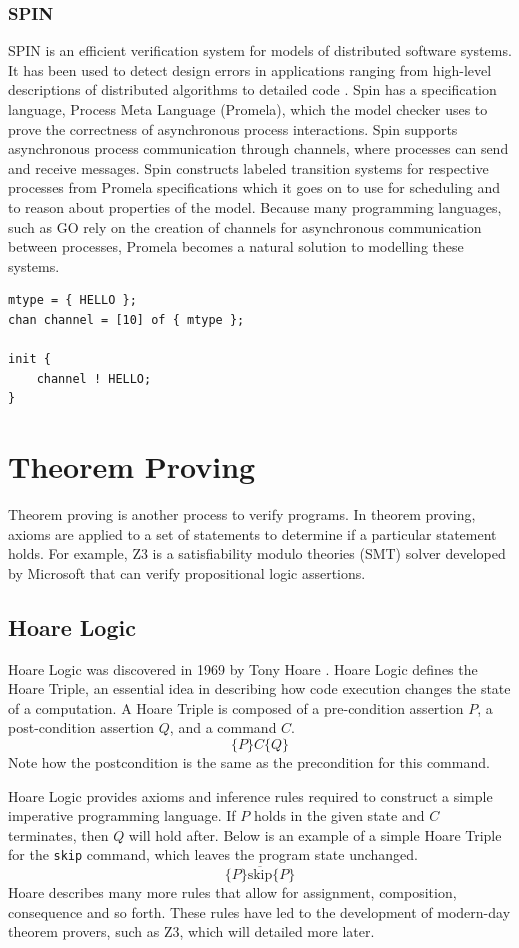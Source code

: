 \subsubsection*{\textbf{SPIN}}
SPIN is an efficient verification system for models of distributed software systems. It has been used to detect design errors in applications ranging from high-level descriptions of distributed algorithms to detailed code \cite{spin}. Spin has a specification language, Process Meta Language (Promela), which the model checker uses to prove the correctness of asynchronous process interactions. Spin supports asynchronous process communication through channels, where processes can send and receive messages. Spin constructs labeled transition systems for respective processes from Promela specifications which it goes on to use for scheduling and to reason about properties of the model. Because many programming languages, such as GO \cite{go} rely on the creation of channels for asynchronous communication between processes, Promela becomes a natural solution to modelling these systems.
\begin{lstlisting}[caption={Example of a Promela specification that enqueues a message in a channel}]
mtype = { HELLO };
chan channel = [10] of { mtype };

init {
    channel ! HELLO;
}
\end{lstlisting}

\section[]{Theorem Proving}
Theorem proving is another process to verify programs. In theorem proving, axioms are applied to a set of statements to determine if a particular statement holds. For example, Z3 \cite{z3} is a satisfiability modulo theories (SMT) solver developed by Microsoft that can verify propositional logic assertions.
\subsection[]{Hoare Logic}
Hoare Logic was discovered in 1969 by Tony Hoare \cite{hoare_logic}. Hoare Logic defines the Hoare Triple, an essential idea in describing how code execution changes the state of a computation. A Hoare Triple is composed of a pre-condition assertion $P$, a post-condition assertion $Q$, and a command $C$.
\[
\{P\}C\{Q\}
\]
Note how the postcondition is the same as the precondition for this command.
\par
Hoare Logic provides axioms and inference rules required to construct a simple imperative programming language. If $P$ holds in the given state and $C$ terminates, then $Q$ will hold after. Below is an example of a simple Hoare Triple for the \texttt{skip} command, which leaves the program state unchanged.
\[
\overline{\{P\}\text{skip}\{P\}}
\]
Hoare describes many more rules that allow for assignment, composition, consequence and so forth. These rules have led to the development of modern-day theorem provers, such as Z3, which will detailed more later.
